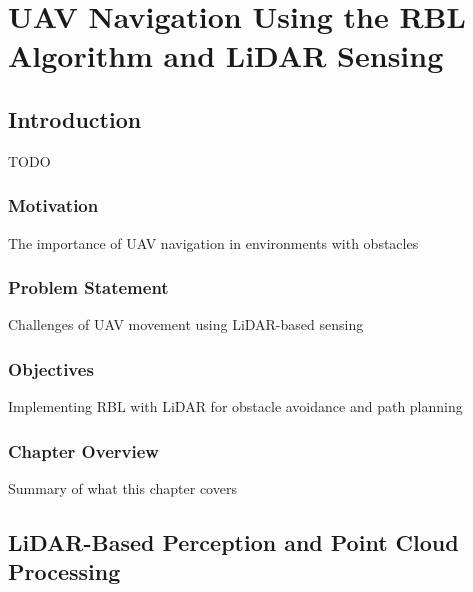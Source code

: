 \chapter{UAV Navigation Using the RBL Algorithm and LiDAR Sensing\label{chap:lidar}}

    \section{Introduction}
        TODO
        \subsection{Motivation}
            The importance of UAV navigation in environments with obstacles
        \subsection{Problem Statement}
            Challenges of UAV movement using LiDAR-based sensing
        \subsection{Objectives}
            Implementing RBL with LiDAR for obstacle avoidance and path planning
        \subsection{Chapter Overview}
            Summary of what this chapter covers

    \section{LiDAR-Based Perception and Point Cloud Processing}
